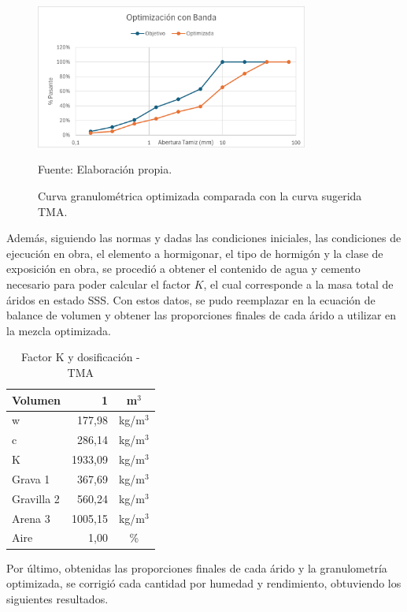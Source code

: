 \begin{figure}[H]
    \centering
    \includegraphics[width=0.8\textwidth]{GRAFICOS/opti_banda.png}
    \caption{Curva granulométrica optimizada comparada con la curva sugerida TMA.}
    Fuente: Elaboración propia.
\end{figure}

Además, siguiendo las normas y dadas las condiciones iniciales, las condiciones de ejecución en obra, el elemento a hormigonar, el tipo de hormigón y la clase de exposición en obra, se procedió a obtener el contenido de agua y cemento necesario para poder calcular el factor $K$, el cual corresponde a la masa total de áridos en estado SSS. Con estos datos, se pudo reemplazar en la ecuación de balance de volumen y obtener las proporciones finales de cada árido a utilizar en la mezcla optimizada.

\begin{table}[H]
\centering
\caption{Factor K y dosificación - TMA}
\label{tab:factor-k-tma}
\setlength{\tabcolsep}{6pt}
\renewcommand{\arraystretch}{1.15}
\small
\begin{tabular}{|l|r|c|}
\hline
\textbf{Volumen} & \textbf{1} & \textbf{m$^{3}$} \\ \hline
w          & 177,98     & kg/m$^{3}$ \\ \hline
c          & 286,14     & kg/m$^{3}$ \\ \hline
K          & 1933,09    & kg/m$^{3}$ \\ \hline
Grava 1    & 367,69     & kg/m$^{3}$ \\ \hline
Gravilla 2 & 560,24     & kg/m$^{3}$ \\ \hline
Arena 3    & 1005,15     & kg/m$^{3}$ \\ \hline
Aire       & 1,00       & \% \\ \hline
\end{tabular}
\end{table}

Por último, obtenidas las proporciones finales de cada árido y la granulometría optimizada, se corrigió cada cantidad por humedad y rendimiento, obtuviendo los siguientes resultados.

